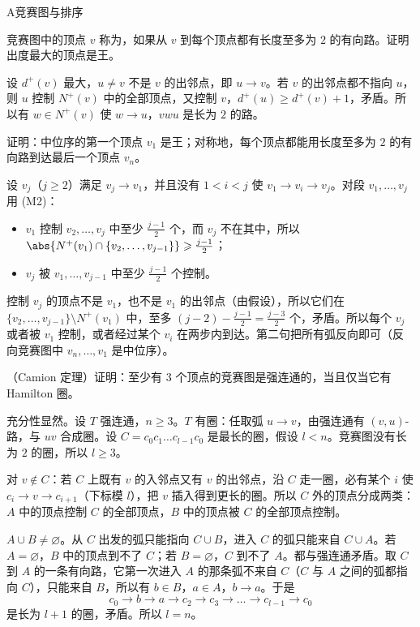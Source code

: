 \begin{exercises}{A}{竞赛图与排序}
\item\label{ex:orderings:A1} 竞赛图中的顶点 $v$ 称为，如果从 $v$ 到每个顶点都有长度至多为 $2$ 的有向路。证明出度最大的顶点是王。
\begin{solution}
设 $d^+(v)$ 最大，$u\neq v$ 不是 $v$ 的出邻点，即 $u\to v$。若 $v$ 的出邻点都不指向 $u$，则 $u$ 控制 $N^+(v)$ 中的全部顶点，又控制 $v$，$d^+(u)\geqslant d^+(v)+1$，矛盾。所以有 $w\in N^+(v)$ 使 $w\to u$，$vwu$ 是长为 $2$ 的路。
\end{solution}

\item\label{ex:orderings:A2} 证明：中位序的第一个顶点 $v_1$ 是王；对称地，每个顶点都能用长度至多为 $2$ 的有向路到达最后一个顶点 $v_n$。
\begin{solution}
设 $v_j$（$j\geqslant2$）满足 $v_j\to v_1$，并且没有 $1<i<j$ 使 $v_1\to v_i\to v_j$。对段 $v_1,\dots,v_j$ 用 (M2)：
\begin{itemize}
\item $v_1$ 控制 $v_2,\dots,v_j$ 中至少 $\frac{j-1}2$ 个，而 $v_j$ 不在其中，所以 $\abs{N^+(v_1)\cap\{v_2,\dots,v_{j-1}\}}\geqslant\frac{j-1}2$；
\item $v_j$ 被 $v_1,\dots,v_{j-1}$ 中至少 $\frac{j-1}2$ 个控制。
\end{itemize}
控制 $v_j$ 的顶点不是 $v_1$，也不是 $v_1$ 的出邻点（由假设），所以它们在 $\{v_2,\dots,v_{j-1}\}\setminus N^+(v_1)$ 中，至多 $(j-2)-\frac{j-1}2=\frac{j-3}2$ 个，矛盾。所以每个 $v_j$ 或者被 $v_1$ 控制，或者经过某个 $v_i$ 在两步内到达。第二句把所有弧反向即可（反向竞赛图中 $v_n,\dots,v_1$ 是中位序）。
\end{solution}

\item\label{ex:orderings:A3} （Camion 定理）证明：至少有 $3$ 个顶点的竞赛图是强连通的，当且仅当它有 Hamilton 圈。
\begin{solution}
充分性显然。设 $T$ 强连通，$n\geqslant3$。$T$ 有圈：任取弧 $u\to v$，由强连通有 $(v,u)$-路，与 $uv$ 合成圈。设 $C=c_0c_1\dots c_{l-1}c_0$ 是最长的圈，假设 $l<n$。竞赛图没有长为 $2$ 的圈，所以 $l\geqslant3$。

对 $v\notin C$：若 $C$ 上既有 $v$ 的入邻点又有 $v$ 的出邻点，沿 $C$ 走一圈，必有某个 $i$ 使 $c_i\to v\to c_{i+1}$（下标模 $l$），把 $v$ 插入得到更长的圈。所以 $C$ 外的顶点分成两类：$A$ 中的顶点控制 $C$ 的全部顶点，$B$ 中的顶点被 $C$ 的全部顶点控制。

$A\cup B\neq\varnothing$。从 $C$ 出发的弧只能指向 $C\cup B$，进入 $C$ 的弧只能来自 $C\cup A$。若 $A=\varnothing$，$B$ 中的顶点到不了 $C$；若 $B=\varnothing$，$C$ 到不了 $A$。都与强连通矛盾。取 $C$ 到 $A$ 的一条有向路，它第一次进入 $A$ 的那条弧不来自 $C$（$C$ 与 $A$ 之间的弧都指向 $C$），只能来自 $B$，所以有 $b\in B$，$a\in A$，$b\to a$。于是
\[
c_0\to b\to a\to c_2\to c_3\to\dots\to c_{l-1}\to c_0
\]
是长为 $l+1$ 的圈，矛盾。所以 $l=n$。
\end{solution}


\end{exercises}
